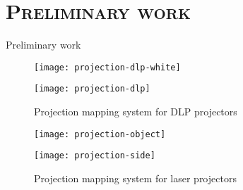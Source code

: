 \section{\scshape Preliminary work}\label{sec:preliminary-work}

\begin{frame}{Preliminary work}
		\begin{figure}[!ht]
			\centering
			\begin{minipage}{.5\textwidth}
				\centering
				\texttt{[image: projection-dlp-white]}
			\end{minipage}%
			\begin{minipage}{0.5\textwidth}
				\centering
				\texttt{[image: projection-dlp]}
			\end{minipage}
			\caption{Projection mapping system for DLP projectors}
		\end{figure}%
		\begin{figure}[!ht]
			\centering
			\begin{minipage}{.5\textwidth}
				\centering
				\texttt{[image: projection-object]}
			\end{minipage}%
			\begin{minipage}{0.5\textwidth}
				\centering
				\texttt{[image: projection-side]}
			\end{minipage}
			\caption{Projection mapping system for laser projectors}
		\end{figure}
\end{frame}

